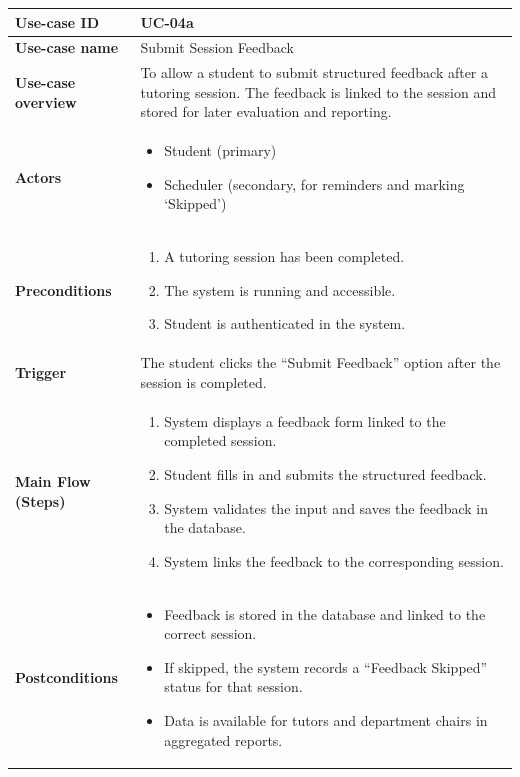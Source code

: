 \begin{center}
\begin{longtable}{|p{3cm}|p{11cm}|}
\hline
\textbf{Use-case ID} & UC-04a \\ 
\hline
\textbf{Use-case name} & Submit Session Feedback \\ 
\hline
\textbf{Use-case overview} & To allow a student to submit structured feedback after a tutoring session. The feedback is linked to the session and stored for later evaluation and reporting. \\ 
\hline
\textbf{Actors} & 
\begin{itemize}
    \item Student (primary)
    \item Scheduler (secondary, for reminders and marking ‘Skipped’)
\end{itemize} \\ 
\hline
\textbf{Preconditions} & 
\begin{enumerate}
    \item A tutoring session has been completed.
    \item The system is running and accessible.
    \item Student is authenticated in the system.
\end{enumerate} \\ 
\hline
\textbf{Trigger} & The student clicks the ``Submit Feedback'' option after the session is completed. \\ 
\hline
\textbf{Main Flow (Steps)} & 
\begin{enumerate}
    \item System displays a feedback form linked to the completed session.
    \item Student fills in and submits the structured feedback.
    \item System validates the input and saves the feedback in the database.
    \item System links the feedback to the corresponding session.
\end{enumerate} \\ 
\hline
\textbf{Postconditions} & 
\begin{itemize}
    \item Feedback is stored in the database and linked to the correct session.
    \item If skipped, the system records a ``Feedback Skipped'' status for that session.
    \item Data is available for tutors and department chairs in aggregated reports.

\end{itemize}
\end{longtable}
\end{center}
